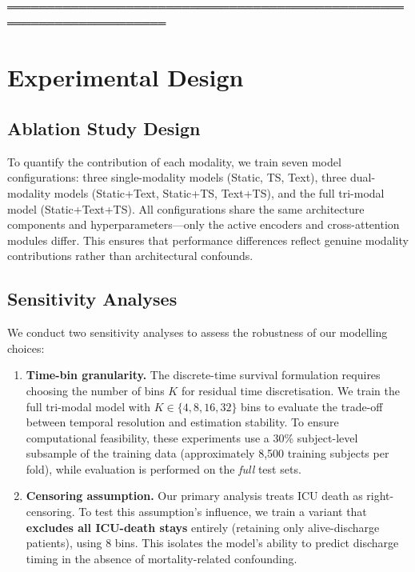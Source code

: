 \documentclass[10pt, a4paper]{article}
\begin{document}
%
══════════════════════════════════════════════════════════════════════
\section{Experimental Design}
\label{sec:exp_design}

\subsection{Ablation Study Design}

To quantify the contribution of each modality, we train seven model configurations: three single-modality models (Static, TS, Text), three dual-modality models (Static+Text, Static+TS, Text+TS), and the full tri-modal model (Static+Text+TS). All configurations share the same architecture components and hyperparameters---only the active encoders and cross-attention modules differ. This ensures that performance differences reflect genuine modality contributions rather than architectural confounds.

\subsection{Sensitivity Analyses}
\label{sec:sensitivity_design}

We conduct two sensitivity analyses to assess the robustness of our modelling choices:

\begin{enumerate}[nosep]
    \item \textbf{Time-bin granularity.} The discrete-time survival formulation requires choosing the number of bins $K$ for residual time discretisation. We train the full tri-modal model with $K \in \{4, 8, 16, 32\}$ bins to evaluate the trade-off between temporal resolution and estimation stability. To ensure computational feasibility, these experiments use a 30\% subject-level subsample of the training data (approximately 8{,}500 training subjects per fold), while evaluation is performed on the \emph{full} test sets.

    \item \textbf{Censoring assumption.} Our primary analysis treats ICU death as right-censoring. To test this assumption's influence, we train a variant that \textbf{excludes all ICU-death stays} entirely (retaining only alive-discharge patients), using 8 bins. This isolates the model's ability to predict discharge timing in the absence of mortality-related confounding.
\end{enumerate}
\end{document}
